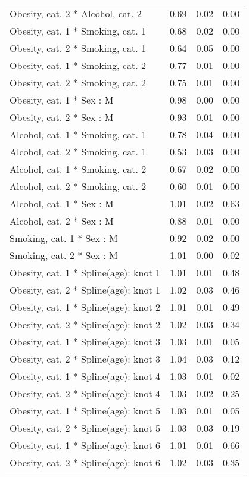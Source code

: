 \documentclass[risks,article,submit,moreauthors,pdftex]{Definitions/mdpi}
\begin{document}
\begin{longtable}{lrrr}
Obesity, cat. 2 * Alcohol, cat. 2 & 0.69 & 0.02 & 0.00 \\ 
Obesity, cat. 1 * Smoking, cat. 1 & 0.68 & 0.02 & 0.00 \\ 
Obesity, cat. 2 * Smoking, cat. 1 & 0.64 & 0.05 & 0.00 \\ 
Obesity, cat. 1 * Smoking, cat. 2 & 0.77 & 0.01 & 0.00 \\ 
Obesity, cat. 2 * Smoking, cat. 2 & 0.75 & 0.01 & 0.00 \\ 
Obesity, cat. 1 * Sex : M & 0.98 & 0.00 & 0.00 \\ 
Obesity, cat. 2 * Sex : M & 0.93 & 0.01 & 0.00 \\ 
Alcohol, cat. 1 * Smoking, cat. 1 & 0.78 & 0.04 & 0.00 \\ 
Alcohol, cat. 2 * Smoking, cat. 1 & 0.53 & 0.03 & 0.00 \\ 
Alcohol, cat. 1 * Smoking, cat. 2 & 0.67 & 0.02 & 0.00 \\ 
Alcohol, cat. 2 * Smoking, cat. 2 & 0.60 & 0.01 & 0.00 \\ 
Alcohol, cat. 1 * Sex : M & 1.01 & 0.02 & 0.63 \\ 
Alcohol, cat. 2 * Sex : M & 0.88 & 0.01 & 0.00 \\ 
Smoking, cat. 1 * Sex : M & 0.92 & 0.02 & 0.00 \\ 
Smoking, cat. 2 * Sex : M & 1.01 & 0.00 & 0.02 \\ 
Obesity, cat. 1 * Spline(age): knot 1 & 1.01 & 0.01 & 0.48 \\ 
Obesity, cat. 2 * Spline(age): knot 1 & 1.02 & 0.03 & 0.46 \\ 
Obesity, cat. 1 * Spline(age): knot 2 & 1.01 & 0.01 & 0.49 \\ 
Obesity, cat. 2 * Spline(age): knot 2 & 1.02 & 0.03 & 0.34 \\ 
Obesity, cat. 1 * Spline(age): knot 3 & 1.03 & 0.01 & 0.05 \\ 
Obesity, cat. 2 * Spline(age): knot 3 & 1.04 & 0.03 & 0.12 \\ 
Obesity, cat. 1 * Spline(age): knot 4 & 1.03 & 0.01 & 0.02 \\ 
Obesity, cat. 2 * Spline(age): knot 4 & 1.03 & 0.02 & 0.25 \\ 
Obesity, cat. 1 * Spline(age): knot 5 & 1.03 & 0.01 & 0.05 \\ 
Obesity, cat. 2 * Spline(age): knot 5 & 1.03 & 0.03 & 0.19 \\ 
Obesity, cat. 1 * Spline(age): knot 6 & 1.01 & 0.01 & 0.66 \\ 
Obesity, cat. 2 * Spline(age): knot 6 & 1.02 & 0.03 & 0.35 \\ 

\end{longtable}
\end{document}
